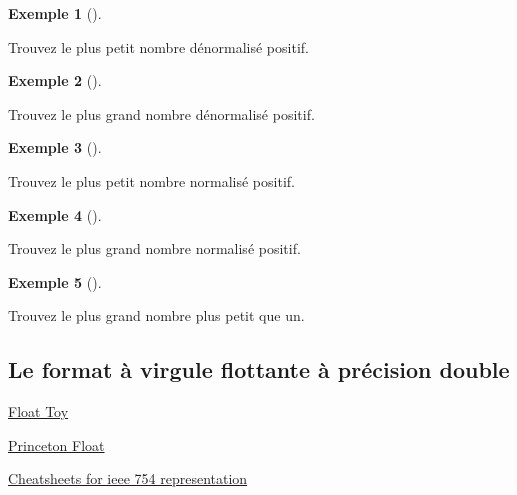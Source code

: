\documentclass[
  letterpaper,
]{scrbook}
\theoremstyle{plain}
\theoremstyle{definition}
\theoremstyle{definition}
\newtheorem{example}{Exemple}[chapter]
\theoremstyle{remark}
\begin{document}
\begin{example}[]\protect\hypertarget{exm-plus-petit-nombre-denormalise}{}\label{exm-plus-petit-nombre-denormalise}

Trouvez le plus petit nombre dénormalisé positif.

\end{example}

\begin{example}[]\protect\hypertarget{exm-plus-grand-nombre-denormalise}{}\label{exm-plus-grand-nombre-denormalise}

Trouvez le plus grand nombre dénormalisé positif.

\end{example}

\begin{example}[]\protect\hypertarget{exm-plus-petit-nombre-normalise}{}\label{exm-plus-petit-nombre-normalise}

Trouvez le plus petit nombre normalisé positif.

\end{example}

\begin{example}[]\protect\hypertarget{exm-plus-grand-nombre-normalise}{}\label{exm-plus-grand-nombre-normalise}

Trouvez le plus grand nombre normalisé positif.

\end{example}

\begin{example}[]\protect\hypertarget{exm-plus-grand-nombre-plus-petit-un}{}\label{exm-plus-grand-nombre-plus-petit-un}

Trouvez le plus grand nombre plus petit que un.

\end{example}

\hypertarget{le-format-uxe0-virgule-flottante-uxe0-pruxe9cision-double}{%
\subsection{Le format à virgule flottante à précision
double}\label{le-format-uxe0-virgule-flottante-uxe0-pruxe9cision-double}}

\href{https://evanw.github.io/float-toy/}{Float Toy}

\href{https://introcs.cs.princeton.edu/java/91float/}{Princeton Float}

\href{https://hackingcpp.com/cpp/lang/fundamental_types.html}{Cheatsheets
for ieee 754 representation}
\end{document}
